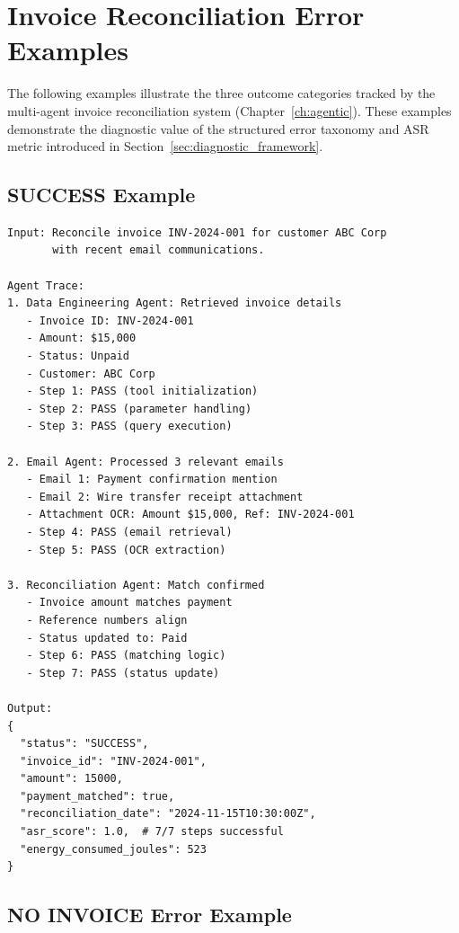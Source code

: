 \section{Invoice Reconciliation Error Examples}
\label{app:invoice_errors}

The following examples illustrate the three outcome categories tracked by the multi-agent invoice reconciliation system (Chapter~\ref{ch:agentic}). These examples demonstrate the diagnostic value of the structured error taxonomy and ASR metric introduced in Section~\ref{sec:diagnostic_framework}.

\subsection{SUCCESS Example}

\begin{verbatim}
Input: Reconcile invoice INV-2024-001 for customer ABC Corp
       with recent email communications.

Agent Trace:
1. Data Engineering Agent: Retrieved invoice details
   - Invoice ID: INV-2024-001
   - Amount: $15,000
   - Status: Unpaid
   - Customer: ABC Corp
   - Step 1: PASS (tool initialization)
   - Step 2: PASS (parameter handling)
   - Step 3: PASS (query execution)

2. Email Agent: Processed 3 relevant emails
   - Email 1: Payment confirmation mention
   - Email 2: Wire transfer receipt attachment
   - Attachment OCR: Amount $15,000, Ref: INV-2024-001
   - Step 4: PASS (email retrieval)
   - Step 5: PASS (OCR extraction)

3. Reconciliation Agent: Match confirmed
   - Invoice amount matches payment
   - Reference numbers align
   - Status updated to: Paid
   - Step 6: PASS (matching logic)
   - Step 7: PASS (status update)

Output:
{
  "status": "SUCCESS",
  "invoice_id": "INV-2024-001",
  "amount": 15000,
  "payment_matched": true,
  "reconciliation_date": "2024-11-15T10:30:00Z",
  "asr_score": 1.0,  # 7/7 steps successful
  "energy_consumed_joules": 523
}
\end{verbatim}

\subsection{NO INVOICE Error Example}

